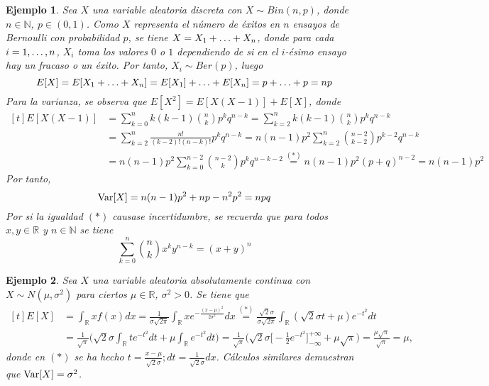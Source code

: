 \documentclass[11pt]{report}
\theoremstyle{mytheorem}
\theoremstyle{mydefinition}
\theoremstyle{myexample}
\newtheorem*{example}{Ejemplo}
\newcommand{\R}{\mathbb R}
\newcommand{\N}{\mathbb N}
\begin{document}
\begin{example}
Sea $X$ una variable aleatoria discreta con $X \sim Bin(n,p)$, donde $n \in \N$, $p \in (0,1)$. Como $X$ representa el número de éxitos en $n$ ensayos de Bernoulli con probabilidad $p$, se tiene $X = X_1+\mathellipsis+X_n$, donde para cada $i = 1,\mathellipsis,n $, $X_i$ toma los valores $0$ o $1$ dependiendo de si en el $i$-ésimo ensayo hay un fracaso o un éxito. Por tanto, $X_i \sim Ber(p)$, luego
\[E[X] = E[X_1+\mathellipsis+X_n] = E[X_1]+\mathellipsis+E[X_n] = p+\mathellipsis+p = np\]
Para la varianza, se observa que $E[X^2] = E[X(X-1)]+E[X]$, donde
\[
\begin{aligned}[t]
    E[X(X-1)] &= \sum_{k=0}^n k(k-1){n \choose k}p^kq^{n-k} = \sum_{k=2}^n k(k-1){n \choose k}p^kq^{n-k} \\
    &= \sum_{k=2}^n \frac{n!}{(k-2)!(n-k)!}p^kq^{n-k} =n(n-1)p^2 \sum_{k=2}^n {n-2 \choose k-2}p^{k-2}q^{n-k} \\ 
    &= n(n-1)p^2\sum_{k=0}^{n-2}{n-2 \choose k}p^kq^{n-k-2} \overset{(*)}{=} n(n-1)p^2(p+q)^{n-2}=n(n-1)p^2
\end{aligned}
\]
Por tanto,
\[\textup{Var}[X] = n(n-1)p^2+np-n^2p^2 = npq\]
Por si la igualdad $(*)$ causase incertidumbre, se recuerda que para todos $x,y \in \R$ y $ n \in \N$ se tiene
\[\sum_{k=0}^{n} {n \choose k}x^ky^{n-k} = (x+y)^n\]
\end{example}

\begin{example}
Sea $X$ una variable aleatoria absolutamente continua con $X \sim N(\mu,\sigma^2)$ para ciertos $\mu \in \R$, $\sigma^2>0$. Se tiene que
\[
\begin{aligned}[t]
E[X] &= \int_\R xf(x)dx = \frac{1}{\sigma\sqrt{2\pi}}\int_\R xe^{-\frac{(x-\mu)^2}{2\sigma^2}}dx \overset{(*)}{=} \frac{\sqrt{2}\sigma}{\sigma\sqrt{2\pi}} \int_\R (\sqrt{2}\sigma t+\mu)e^{-t^2}dt \\
&= \frac{1}{\sqrt{\pi}}\biggl(\sqrt{2}\sigma \int_\R te^{-t^2}dt+\mu \int_\R e^{-t^2}dt \biggr) = \frac{1}{\sqrt{\pi}}\biggl(\sqrt{2}\sigma\biggl[ -\frac{1}{2}e^{-t^2} \biggr]_{-\infty}^{+\infty}+\mu \sqrt{\pi} \biggr)= \frac{\mu \sqrt{\pi}}{\sqrt{\pi}} = \mu,
\end{aligned}
\]
donde en $(*)$ se ha hecho $t = \frac{x-\mu}{\sqrt{2}\sigma}; dt = \frac{1}{\sqrt{2}\sigma} dx$. Cálculos similares demuestran que $\textup{Var}[X] = \sigma^2$.
\end{example}
\end{document}
